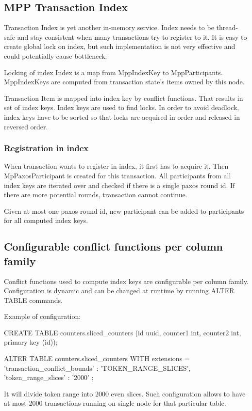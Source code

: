 \subsection{MPP Transaction Index}
Transaction Index is yet another in-memory service. Index needs to be thread-safe and stay consistent when many transactions try to register to it. It is easy to create global lock on index, but such implementation is not very effective and could potentially cause bottleneck. 


Locking of index
Index is a map from MppIndexKey to MppParticipants. MppIndexKeys are computed from transaction state’s items owned by this node. 


Transaction Item is mapped into index key by conflict functions. That results in set of index keys. Index keys are used to find locks. In order to avoid deadlock, index keys have to be sorted so that locks are acquired in order and released in reversed order.


\subsubsection{Registration in index}
When transaction wants to register in index, it first has to acquire it. Then MpPaxosParticipant is created for this transaction. All participants from all index keys are iterated over and checked if there is a single paxos round id. If there are more potential rounds, transaction cannot continue. 


Given at most one paxos round id, new participant can be added to participants for all computed index keys.


\subsection{Configurable conflict functions per column family}
Conflict functions used to compute index keys are configurable per column family. Configuration is dynamic and can be changed at runtime by running ALTER TABLE commands.


Example of configuration:


CREATE TABLE counters.sliced_counters (id uuid, counter1 int, counter2 int, primary key (id));


ALTER TABLE counters.sliced_counters WITH extensions = { 'transaction_conflict_bounds' : 'TOKEN_RANGE_SLICES', 'token_range_slices' : '2000' };


It will divide token range into 2000 even slices. Such configuration allows to have at most 2000 transactions running on single node for that particular table.


